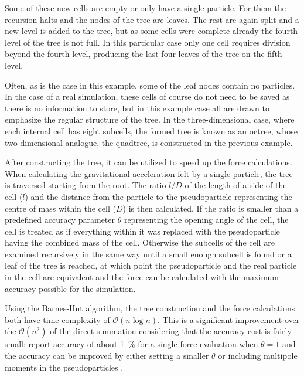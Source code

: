 \documentclass[english, twoside]{HYgradu}
\begin{document}
Some of these new cells are empty or only have a single particle. For them the recursion halts and the nodes of the tree are leaves. The rest are again split and a new level is added to the tree, but as some cells were complete already the fourth level of the tree is not full. In this particular case only one cell requires division beyond the fourth level, producing the last four leaves of the tree on the fifth level.

Often, as is the case in this example, some of the leaf nodes contain no particles. In the case of a real simulation, these cells of course do not need to be saved as there is no information to store, but in this example case all are drawn to emphasize the regular structure of the tree. In the three-dimensional case, where each internal cell has eight subcells, the formed tree is known as an octree, whose two-dimensional analogue, the quadtree, is constructed in the previous example.

After constructing the tree, it can be utilized to speed up the force calculations. When calculating the gravitational acceleration felt by a single particle, the tree is traversed starting from the root. The ratio $l/D$ of the length of a side of the cell ($l$) and the distance from the particle to the pseudoparticle representing the centre of mass within the cell ($D$) is then calculated. If the ratio is smaller than a predefined accuracy parameter $\theta$ representing the opening angle of the cell, the cell is treated as if everything within it was replaced with the pseudoparticle having the combined mass of the cell. Otherwise the subcells of the cell are examined recursively in the same way until a small enough subcell is found or a leaf of the tree is reached, at which point the pseudoparticle and the real particle in the cell are equivalent and the force can be calculated with the maximum accuracy possible for the simulation.

Using the Barnes-Hut algorithm, the tree construction and the force calculations both have time complexity of $\mathcal{O}(n \log n)$. This is a significant improvement over the $\mathcal{O}(n^2)$ of the direct summation considering that the accuracy cost is fairly small: \citet{barnes1986hierarchical} report accuracy of about 1~\% for a single force evaluation when $\theta=1$ and the accuracy can be improved by either setting a smaller $\theta$ or including multipole moments in the pseudoparticles \citep{barnes1989error}. %
\end{document}
